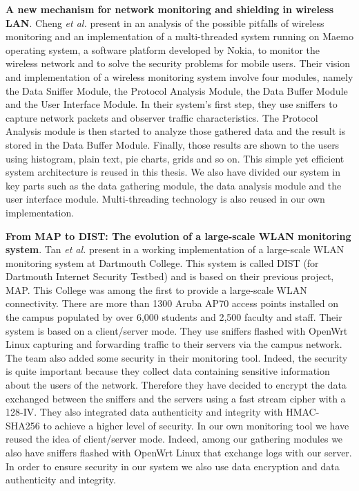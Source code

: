 \textbf{A new mechanism for network monitoring and shielding in wireless LAN}. Cheng \textit{et al.} present in \cite{article2} an analysis of the possible pitfalls of wireless monitoring and an implementation of a multi-threaded system running on Maemo operating system, a software platform developed by Nokia, to monitor the wireless network and to solve the security problems for mobile users. Their vision and implementation of a wireless monitoring system involve four modules, namely the Data Sniffer Module, the Protocol Analysis Module, the Data Buffer Module and the User Interface Module. In their system's first step, they use sniffers to capture network packets and observer traffic characteristics. The Protocol Analysis module is then started to analyze those gathered data and the result is stored in the Data Buffer Module. Finally, those results are shown to the users using histogram, plain text, pie charts, grids and so on. This simple yet efficient system architecture is reused in this thesis. We also have divided our system in key parts such as the data gathering module, the data analysis module and the user interface module. Multi-threading technology is also reused in our own implementation.

\textbf{From MAP to DIST: The evolution of a large-scale WLAN monitoring system}. Tan \textit{et al.} present in \citep{article3} a working implementation of a large-scale WLAN monitoring system at Dartmouth College. This system is called DIST (for Dartmouth Internet Security Testbed) and is based on their previous project, MAP. This College was among the first to provide a large-scale WLAN connectivity. There are more than 1300 Aruba AP70 access points installed on the campus populated by over 6,000 students and 2,500 faculty and staff. Their system is based on a client/server mode. They use sniffers flashed with OpenWrt Linux capturing and forwarding traffic to their servers via the campus network. The team also added some security in their monitoring tool. Indeed, the security is quite important because they collect data containing sensitive information about the users of the network. Therefore they have decided to encrypt the data exchanged between the sniffers and the servers using a fast stream cipher with a 128-IV. They also integrated data authenticity and integrity with HMAC-SHA256 to achieve a higher level of security. In our own monitoring tool we have reused the idea of client/server mode. Indeed, among our gathering modules we also have sniffers flashed with OpenWrt Linux that exchange logs with our server. In order to ensure security in our system we also use data encryption and data authenticity and integrity.



